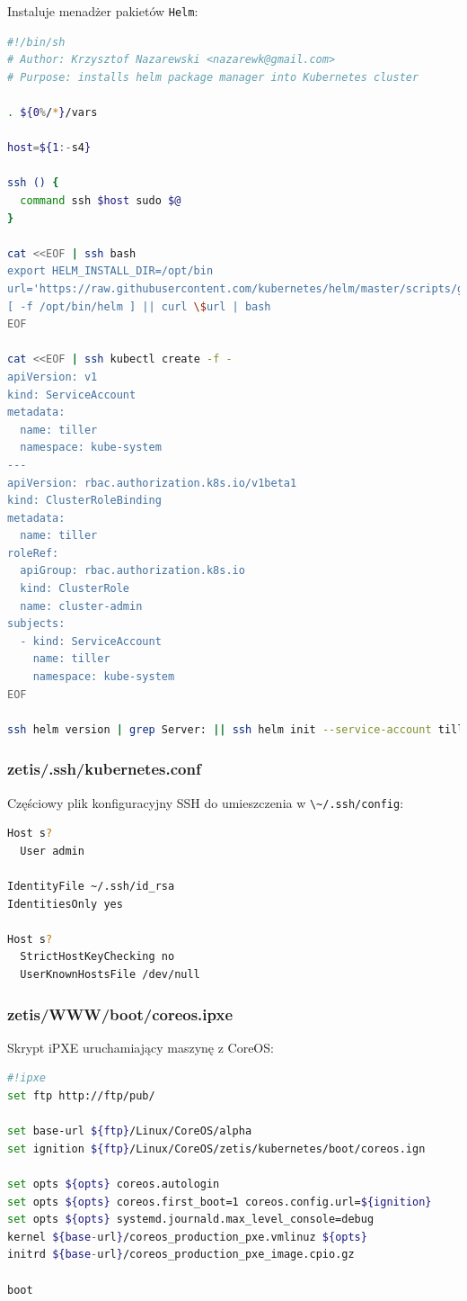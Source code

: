 \documentclass[a4paper,12pt,twoside,openany]{report}
\newcommand{\passthrough}[1]{#1}
\begin{document}
Instaluje menadżer pakietów \passthrough{\lstinline!Helm!}:

\begin{lstlisting}[language=bash]
#!/bin/sh
# Author: Krzysztof Nazarewski <nazarewk@gmail.com>
# Purpose: installs helm package manager into Kubernetes cluster

. ${0%/*}/vars

host=${1:-s4}

ssh () {
  command ssh $host sudo $@
}

cat <<EOF | ssh bash
export HELM_INSTALL_DIR=/opt/bin
url='https://raw.githubusercontent.com/kubernetes/helm/master/scripts/get'
[ -f /opt/bin/helm ] || curl \$url | bash
EOF

cat <<EOF | ssh kubectl create -f -
apiVersion: v1
kind: ServiceAccount
metadata:
  name: tiller
  namespace: kube-system
---
apiVersion: rbac.authorization.k8s.io/v1beta1
kind: ClusterRoleBinding
metadata:
  name: tiller
roleRef:
  apiGroup: rbac.authorization.k8s.io
  kind: ClusterRole
  name: cluster-admin
subjects:
  - kind: ServiceAccount
    name: tiller
    namespace: kube-system
EOF

ssh helm version | grep Server: || ssh helm init --service-account tiller
\end{lstlisting}

\hypertarget{zetis.sshkubernetes.conf}{%
\subsubsection{zetis/.ssh/kubernetes.conf}\label{zetis.sshkubernetes.conf}}

Częściowy plik konfiguracyjny SSH do umieszczenia w
\passthrough{\lstinline!\~/.ssh/config!}:

\begin{lstlisting}[language=bash]
Host s?
  User admin

IdentityFile ~/.ssh/id_rsa
IdentitiesOnly yes

Host s?
  StrictHostKeyChecking no
  UserKnownHostsFile /dev/null
\end{lstlisting}

\hypertarget{zetiswwwbootcoreos.ipxe}{%
\subsubsection{zetis/WWW/boot/coreos.ipxe}\label{zetiswwwbootcoreos.ipxe}}

Skrypt iPXE uruchamiający maszynę z CoreOS:

\begin{lstlisting}[language=bash]
#!ipxe
set ftp http://ftp/pub/

set base-url ${ftp}/Linux/CoreOS/alpha
set ignition ${ftp}/Linux/CoreOS/zetis/kubernetes/boot/coreos.ign

set opts ${opts} coreos.autologin
set opts ${opts} coreos.first_boot=1 coreos.config.url=${ignition}
set opts ${opts} systemd.journald.max_level_console=debug
kernel ${base-url}/coreos_production_pxe.vmlinuz ${opts}
initrd ${base-url}/coreos_production_pxe_image.cpio.gz

boot
\end{lstlisting}
\end{document}
